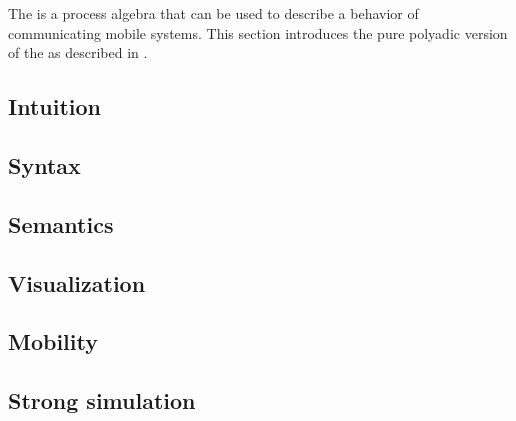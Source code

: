 The \findex[\picalc{}|(]{\picalc{}} is a process algebra that can be used to describe a behavior of communicating mobile systems. This section introduces the pure polyadic version of the \picalc{} as described in \cite{milner}. 


\subsection{Intuition}
\label{sec_pi_intuition}


\subsection{Syntax}
\label{sec_pi_syntax}


\subsection{Semantics}
\label{sec_pi_sem}


\subsection{Visualization}
\label{sec_pi_visualization}


\subsection{Mobility}
\label{sec_pi_mobility}


\subsection{Strong simulation}
\label{sec_pi_simulation}


\newpage %
